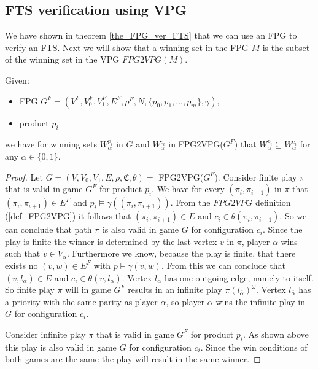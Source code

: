 \subsection{FTS verification using VPG}
We have shown in theorem \ref{the_FPG_ver_FTS} that we can use an FPG to verify an FTS. Next we will show that a winning set in the FPG $M$ is the subset of the winning set in the VPG $FPG2VPG(M)$.
\begin{theorem}
	\label{the_FPG_sub_VPG}
	Given:
	\begin{itemize}
		\item FPG $G^F = (V^F, V_0^F, V_1^F, E^F, \rho^F, N, \{p_0, p_1, \dots, p_m\}, \gamma)$,
		\item product $p_i$
	\end{itemize}
	we have for winning sets $W_\alpha^{p_i}$ in $G$ and $W_\alpha^{c_i}$ in FPG2VPG($G^F$) that $W_\alpha^{p_i} \subseteq W_\alpha^{c_i}$ for any $\alpha \in \{0,1\}$.
	\begin{proof}
		Let $G = (V,V_0,V_1, E, \rho, \mathfrak{C},\theta) =$ FPG2VPG($G^F$). Consider finite play $\pi$ that is valid in game $G^F$ for product $p_i$. We have for every $(\pi_i, \pi_{i+1})$ in $\pi$ that $(\pi_i, \pi_{i+1}) \in E^F$ and $p_i \models \gamma((\pi_i, \pi_{i+1}))$. From the $FPG2VPG$ definition (\ref{def_FPG2VPG}) it follows that $(\pi_i, \pi_{i+1}) \in E$ and $c_i \in \theta(\pi_i, \pi_{i+1})$. So we can conclude that path $\pi$ is also valid in game $G$ for configuration $c_i$. Since the play is finite the winner is determined by the last vertex $v$ in $\pi$, player $\alpha$ wins such that $v \in V_{\overline{\alpha}}$. Furthermore we know, because the play is finite, that there exists no $(v,w) \in E^F$ with $p \models \gamma(v,w)$. From this we can conclude that $(v, l_{\overline{\alpha}}) \in E$ and $c_i \in \theta(v, l_{\overline{\alpha}})$. Vertex $l_{\overline{\alpha}}$ has one outgoing edge, namely to itself. So finite play $\pi$ will in game $G^F$ results in an infinite play $\pi(l_{\overline{\alpha}})^\omega$. Vertex $l_{\overline{\alpha}}$ has a priority with the same parity as player $\alpha$, so player $\alpha$ wins the infinite play in $G$ for configuration $c_i$.
		
		Consider infinite play $\pi$ that is valid in game $G^F$ for product $p_i$. As shown above this play is also valid in game $G$ for configuration $c_i$. Since the win conditions of both games are the same the play will result in the same winner.
		

\end{proof}
\end{theorem}
